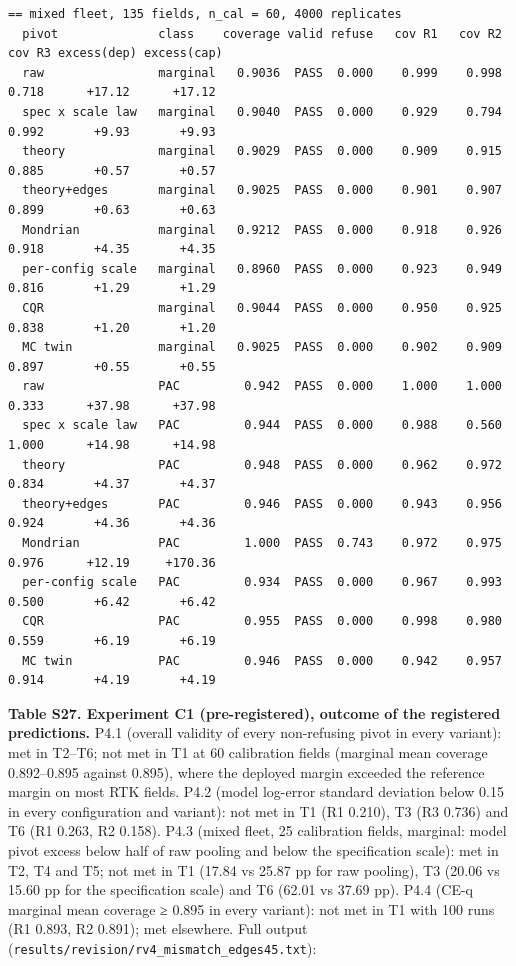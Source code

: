 \documentclass[preprint,12pt,authoryear]{elsarticle}
\begin{document}
\begin{Verbatim}[fontsize=\tiny,breaklines]
== mixed fleet, 135 fields, n_cal = 60, 4000 replicates
  pivot              class    coverage valid refuse   cov R1   cov R2   cov R3 excess(dep) excess(cap)
  raw                marginal   0.9036  PASS  0.000    0.999    0.998    0.718      +17.12      +17.12
  spec x scale law   marginal   0.9040  PASS  0.000    0.929    0.794    0.992       +9.93       +9.93
  theory             marginal   0.9029  PASS  0.000    0.909    0.915    0.885       +0.57       +0.57
  theory+edges       marginal   0.9025  PASS  0.000    0.901    0.907    0.899       +0.63       +0.63
  Mondrian           marginal   0.9212  PASS  0.000    0.918    0.926    0.918       +4.35       +4.35
  per-config scale   marginal   0.8960  PASS  0.000    0.923    0.949    0.816       +1.29       +1.29
  CQR                marginal   0.9044  PASS  0.000    0.950    0.925    0.838       +1.20       +1.20
  MC twin            marginal   0.9025  PASS  0.000    0.902    0.909    0.897       +0.55       +0.55
  raw                PAC         0.942  PASS  0.000    1.000    1.000    0.333      +37.98      +37.98
  spec x scale law   PAC         0.944  PASS  0.000    0.988    0.560    1.000      +14.98      +14.98
  theory             PAC         0.948  PASS  0.000    0.962    0.972    0.834       +4.37       +4.37
  theory+edges       PAC         0.946  PASS  0.000    0.943    0.956    0.924       +4.36       +4.36
  Mondrian           PAC         1.000  PASS  0.743    0.972    0.975    0.976      +12.19     +170.36
  per-config scale   PAC         0.934  PASS  0.000    0.967    0.993    0.500       +6.42       +6.42
  CQR                PAC         0.955  PASS  0.000    0.998    0.980    0.559       +6.19       +6.19
  MC twin            PAC         0.946  PASS  0.000    0.942    0.957    0.914       +4.19       +4.19
\end{Verbatim}

\textbf{Table S27. Experiment C1 (pre-registered), outcome of the registered predictions.} P4.1 (overall validity of every non-refusing pivot in every variant): met in T2--T6; not met in T1 at 60 calibration fields (marginal mean coverage 0.892--0.895 against 0.895), where the deployed margin exceeded the reference margin on most RTK fields. P4.2 (model log-error standard deviation below 0.15 in every configuration and variant): not met in T1 (R1 0.210), T3 (R3 0.736) and T6 (R1 0.263, R2 0.158). P4.3 (mixed fleet, 25 calibration fields, marginal: model pivot excess below half of raw pooling and below the specification scale): met in T2, T4 and T5; not met in T1 (17.84 vs 25.87 pp for raw pooling), T3 (20.06 vs 15.60 pp for the specification scale) and T6 (62.01 vs 37.69 pp). P4.4 (CE-q marginal mean coverage ≥ 0.895 in every variant): not met in T1 with 100 runs (R1 0.893, R2 0.891); met elsewhere. Full output (\texttt{results/revision/rv4\_mismatch\_edges45.txt}):
\end{document}

